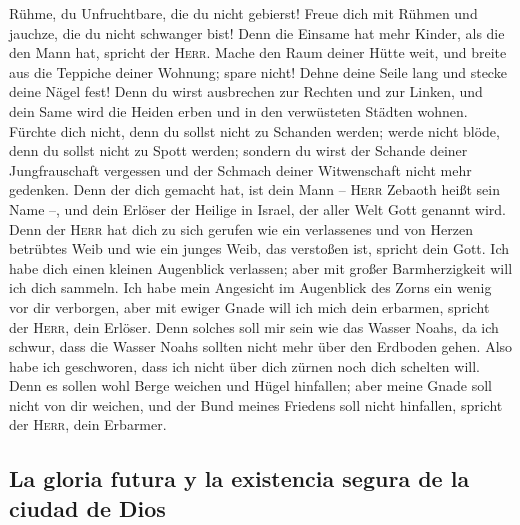 Rühme, du Unfruchtbare, die du nicht gebierst! Freue dich
mit Rühmen und jauchze, die du nicht schwanger bist! Denn die Einsame
hat mehr Kinder, als die den Mann hat, spricht der \textsc{Herr}.
 Mache den Raum deiner Hütte weit, und breite aus die
Teppiche deiner Wohnung; spare nicht! Dehne deine Seile lang und stecke
deine Nägel fest!  Denn du wirst ausbrechen zur Rechten
und zur Linken, und dein Same wird die Heiden erben und in den
verwüsteten Städten wohnen.  Fürchte dich nicht, denn du
sollst nicht zu Schanden werden; werde nicht blöde, denn du sollst nicht
zu Spott werden; sondern du wirst der Schande deiner Jungfrauschaft
vergessen und der Schmach deiner Witwenschaft nicht mehr gedenken.
 Denn der dich gemacht hat, ist dein Mann -- \textsc{Herr}
Zebaoth heißt sein Name --, und dein Erlöser der Heilige in Israel, der
aller Welt Gott genannt wird.  Denn der \textsc{Herr} hat
dich zu sich gerufen wie ein verlassenes und von Herzen betrübtes Weib
und wie ein junges Weib, das verstoßen ist, spricht dein Gott.
 Ich habe dich einen kleinen Augenblick verlassen; aber
mit großer Barmherzigkeit will ich dich sammeln.  Ich habe
mein Angesicht im Augenblick des Zorns ein wenig vor dir verborgen, aber
mit ewiger Gnade will ich mich dein erbarmen, spricht der \textsc{Herr},
dein Erlöser.  Denn solches soll mir sein wie das Wasser
Noahs, da ich schwur, dass die Wasser Noahs sollten nicht mehr über den
Erdboden gehen. Also habe ich geschworen, dass ich nicht über dich
zürnen noch dich schelten will.  Denn es sollen wohl
Berge weichen und Hügel hinfallen; aber meine Gnade soll nicht von dir
weichen, und der Bund meines Friedens soll nicht hinfallen, spricht der
\textsc{Herr}, dein Erbarmer.

\hypertarget{la-gloria-futura-y-la-existencia-segura-de-la-ciudad-de-dios}{%
\subsection{La gloria futura y la existencia segura de la ciudad de
Dios}\label{la-gloria-futura-y-la-existencia-segura-de-la-ciudad-de-dios}}

